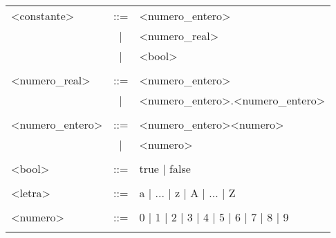 \begin{tabular}{| p{3.5cm} c p{10cm} |}
\hline
<constante>               &::=&  <numero\_entero> \\
                           &|&  <numero\_real> \\
                           &|&  <bool> \\
&&\\

<numero\_real>             &::=&  <numero\_entero> \\
                           &|&  <numero\_entero>.<numero\_entero> \\
&&\\

<numero\_entero>           &::=&  <numero\_entero><numero> \\
                           &|&  <numero> \\
&&\\

<bool>                    &::=&  true | false \\
&&\\

<letra>                   &::=&  a | ... | z | A | ... | Z \\
&&\\

<numero>                  &::=&  0 | 1 | 2 | 3 | 4 | 5 | 6 | 7 | 8 | 9 \\
&&\\
\hline
\end{tabular}


\endinput
